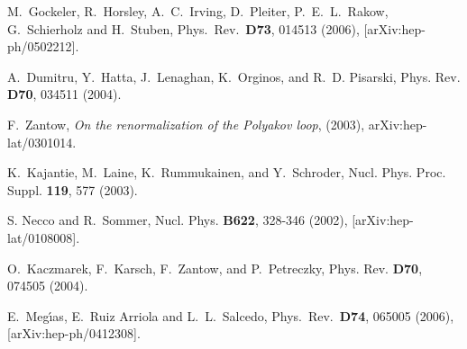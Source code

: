 \begin{thebibliography}{10}
  M.~Gockeler, R.~Horsley, A.~C.~Irving, D.~Pleiter, P.~E.~L.~Rakow, G.~Schierholz and H.~Stuben,
  Phys.\ Rev.\  {\bf D73}, 014513 (2006),
  [arXiv:hep-ph/0502212].


A.~Dumitru, Y.~Hatta, J.~Lenaghan, K.~Orginos, and R.~D. Pisarski,
\newblock Phys. Rev. {\bf D70}, 034511 (2004).%


F.~Zantow, {\it On the renormalization of the Polyakov loop},
\newblock (2003), arXiv:hep-lat/0301014.


K.~Kajantie, M.~Laine, K.~Rummukainen, and Y.~Schroder,
\newblock Nucl. Phys. Proc. Suppl. {\bf 119}, 577 (2003).%



S. Necco and R.~Sommer,
\newblock Nucl. Phys. {\bf B622}, 328-346 (2002), [arXiv:hep-lat/0108008].

O.~Kaczmarek, F.~Karsch, F.~Zantow, and P.~Petreczky,
\newblock  Phys. Rev. {\bf D70}, 074505 (2004).

































  E.~Meg\'{\i}as, E.~Ruiz Arriola and L.~L.~Salcedo,
  Phys.\ Rev.\  {\bf D74}, 065005 (2006),
  [arXiv:hep-ph/0412308].



\end{thebibliography}
